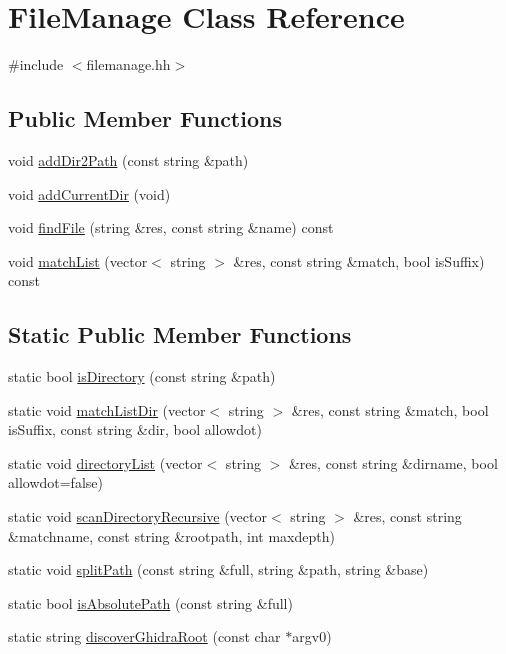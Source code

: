 \hypertarget{class_file_manage}{}\section{File\+Manage Class Reference}
\label{class_file_manage}


{\ttfamily \#include $<$filemanage.\+hh$>$}

\subsection*{Public Member Functions}
\begin{DoxyCompactItemize}
\item 
void \mbox{\hyperlink{class_file_manage_a326d24da789cd3adde140bd1c5e5b7e6}{add\+Dir2\+Path}} (const string \&path)
\item 
void \mbox{\hyperlink{class_file_manage_a58692ff821c7b1570559291ea14be363}{add\+Current\+Dir}} (void)
\item 
void \mbox{\hyperlink{class_file_manage_abc430305a56bcf90db9eca772676b3a6}{find\+File}} (string \&res, const string \&name) const
\item 
void \mbox{\hyperlink{class_file_manage_aeba79cb34d9727c1660d1710fd356e30}{match\+List}} (vector$<$ string $>$ \&res, const string \&match, bool is\+Suffix) const
\end{DoxyCompactItemize}
\subsection*{Static Public Member Functions}
\begin{DoxyCompactItemize}
\item 
static bool \mbox{\hyperlink{class_file_manage_af88425307be1ac649af869abbf4ac9a7}{is\+Directory}} (const string \&path)
\item 
static void \mbox{\hyperlink{class_file_manage_ab0a82bdd34c86126156263e732bcbca4}{match\+List\+Dir}} (vector$<$ string $>$ \&res, const string \&match, bool is\+Suffix, const string \&dir, bool allowdot)
\item 
static void \mbox{\hyperlink{class_file_manage_a3394b908aa55d5f59d05cfafac789259}{directory\+List}} (vector$<$ string $>$ \&res, const string \&dirname, bool allowdot=false)
\item 
static void \mbox{\hyperlink{class_file_manage_ab6197b51380f92ab7cd595edc96efb47}{scan\+Directory\+Recursive}} (vector$<$ string $>$ \&res, const string \&matchname, const string \&rootpath, int maxdepth)
\item 
static void \mbox{\hyperlink{class_file_manage_a7c7130f99f99539159c25e94d6b3ea15}{split\+Path}} (const string \&full, string \&path, string \&base)
\item 
static bool \mbox{\hyperlink{class_file_manage_a04c3c512ed3ab22194c34729dd2dd20e}{is\+Absolute\+Path}} (const string \&full)
\item 
static string \mbox{\hyperlink{class_file_manage_a534d2dfa5b06da668dd06ea0d9596038}{discover\+Ghidra\+Root}} (const char $\ast$argv0)
\end{DoxyCompactItemize}


